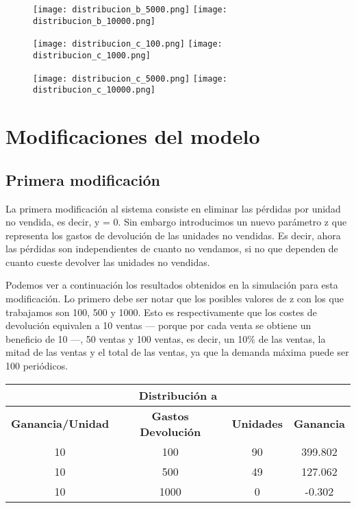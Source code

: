 \begin{figure}[H]
	\centering
	\texttt{[image: distribucion\_b\_5000.png]}
	\texttt{[image: distribucion\_b\_10000.png]}
\end{figure}

\begin{figure}[H]
	\centering
	\texttt{[image: distribucion\_c\_100.png]}
	\texttt{[image: distribucion\_c\_1000.png]}
\end{figure}

\begin{figure}[H]
	\centering
	\texttt{[image: distribucion\_c\_5000.png]}
	\texttt{[image: distribucion\_c\_10000.png]}
\end{figure}



\section{Modificaciones del modelo}

\subsection{Primera modificación}
La primera modificación al sistema consiste en eliminar las pérdidas por unidad no vendida, es decir, y = 0. Sin embargo introducimos un nuevo parámetro z que representa los gastos de devolución de las unidades no vendidas. Es decir, ahora las pérdidas son independientes de cuanto no vendamos, si no que dependen de cuanto cueste devolver las unidades no vendidas.

Podemos ver a continuación los resultados obtenidos en la simulación para esta modificación. Lo primero debe ser notar que los posibles valores de z con los que trabajamos son 100, 500 y 1000. Esto es respectivamente que los costes de devolución equivalen a 10 ventas --- porque por cada venta se obtiene un beneficio de 10 ---, 50 ventas y 100 ventas, es decir, un 10\% de las ventas, la mitad de las ventas y el total de las ventas, ya que la demanda máxima puede ser 100 periódicos.


\begin{table}[H]
\centering
\begin{tabular}{|c|c|c|c|}
\hline
\multicolumn{4}{|c|}{\textbf{Distribución a}} \\ \hline
\textbf{Ganancia/Unidad} & \textbf{Gastos Devolución} & \textbf{Unidades} & \textbf{Ganancia} \\ \hline
10 & 100 & 90 & 399.802 \\
10 & 500 & 49 & 127.062 \\
10 & 1000 & 0 & -0.302 \\ \hline
\end{tabular}
\end{table}

